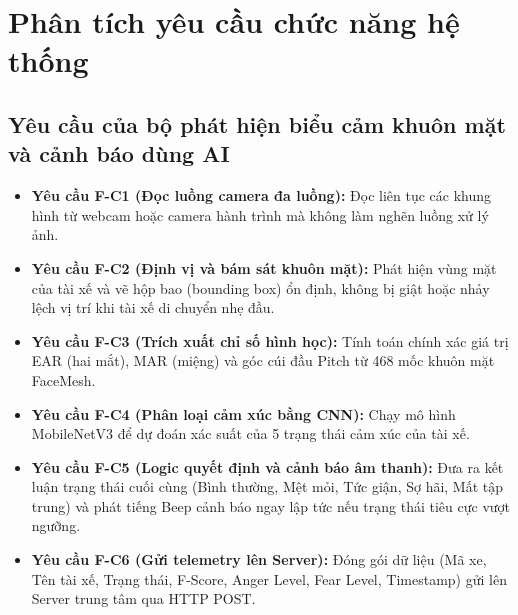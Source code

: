 \documentclass[../DoAn.tex]{subfiles}
\begin{document}
\section{Phân tích yêu cầu chức năng hệ thống}
\label{section:2.3}

\subsection{Yêu cầu của bộ phát hiện biểu cảm khuôn mặt và cảnh báo dùng AI}
\begin{itemize}
    \item \textbf{Yêu cầu F-C1 (Đọc luồng camera đa luồng):} Đọc liên tục các khung hình từ webcam hoặc camera hành trình mà không làm nghẽn luồng xử lý ảnh.
    \item \textbf{Yêu cầu F-C2 (Định vị và bám sát khuôn mặt):} Phát hiện vùng mặt của tài xế và vẽ hộp bao (bounding box) ổn định, không bị giật hoặc nhảy lệch vị trí khi tài xế di chuyển nhẹ đầu.
    \item \textbf{Yêu cầu F-C3 (Trích xuất chỉ số hình học):} Tính toán chính xác giá trị EAR (hai mắt), MAR (miệng) và góc cúi đầu Pitch từ 468 mốc khuôn mặt FaceMesh.
    \item \textbf{Yêu cầu F-C4 (Phân loại cảm xúc bằng CNN):} Chạy mô hình MobileNetV3 để dự đoán xác suất của 5 trạng thái cảm xúc của tài xế.
    \item \textbf{Yêu cầu F-C5 (Logic quyết định và cảnh báo âm thanh):} Đưa ra kết luận trạng thái cuối cùng (Bình thường, Mệt mỏi, Tức giận, Sợ hãi, Mất tập trung) và phát tiếng Beep cảnh báo ngay lập tức nếu trạng thái tiêu cực vượt ngưỡng.
    \item \textbf{Yêu cầu F-C6 (Gửi telemetry lên Server):} Đóng gói dữ liệu (Mã xe, Tên tài xế, Trạng thái, F-Score, Anger Level, Fear Level, Timestamp) gửi lên Server trung tâm qua HTTP POST.
\end{itemize}
\end{document}
